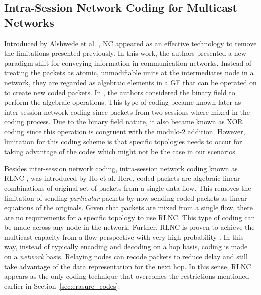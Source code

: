\subsection{Intra-Session Network Coding for Multicast Networks}
Introduced by Alshwede et al. \cite{ahlswede2000network}, \ac{NC} appeared as an effective technology to remove the limitations presented previously. In this work, the authors presented a new paradigm shift for conveying information in communication networks. Instead of treating the packets as atomic, unmodifiable units at the intermediates node in a network, they are regarded as algebraic elements in a \ac{GF} that can be operated on to create new coded packets. In \cite{ahlswede2000network}, the authors considered the binary field to perform the algebraic operations. This type of coding became known later as inter-session network coding since packets from two sessions where mixed in the coding process. Due to the binary field nature, it also became known as XOR coding since this operation is congruent with the modulo-2 addition. However, limitation for this coding scheme is that specific topologies needs to occur for taking advantage of the codes which might not be the case in our scenarios.

Besides inter-session network coding, intra-session network coding known as \ac{RLNC} \cite{ho2006random}, was introduced by Ho et al. Here, coded packets are algebraic linear combinations of original set of packets from a single data flow. This removes the limitation of sending \textit{particular} packets by now sending coded packets as linear equations of the originals. Given that packets are mixed from a single flow, there are no requirements for a specific topology to use \ac{RLNC}. This type of coding can be made across any node in the network. Further, \ac{RLNC} is proven to achieve the multicast capacity from a flow perspective with very high probability \cite{koetter2003algebraic,ho2006random}. In this way, instead of typically encoding and decoding on a hop basis, coding is made on a \textit{network} basis. Relaying nodes can recode packets to reduce delay and still take advantage of the data representation for the next hop. In this sense, \ac{RLNC} appears as the only coding technique that overcomes the restrictions mentioned earlier in Section~\ref{sec:erasure_codes}.


